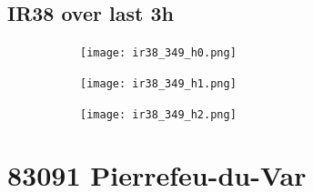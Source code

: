 \documentclass{article}
\begin{document}
\vspace{-1em}
\subsection*{IR38 over last 3h}
\vspace{-1em}
\begin{figure}[H]
    \centering
    \begin{subfigure}[b]{0.32\textwidth}
        \centering
        \texttt{[image: ir38\_349\_h0.png]} %
    \end{subfigure}
    \begin{subfigure}[b]{0.32\textwidth}
        \centering
        \texttt{[image: ir38\_349\_h1.png]} %
    \end{subfigure}
    \begin{subfigure}[b]{0.32\textwidth}
        \centering
        \texttt{[image: ir38\_349\_h2.png]} %
    \end{subfigure}
\end{figure}

\vspace{-1em}
\section*{83091 Pierrefeu-du-Var}
\vspace{-1em}
\end{document}
